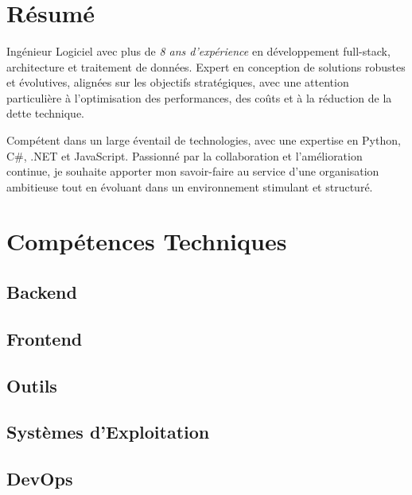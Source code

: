 \documentclass[11pt,a4paper,sans]{moderncv}
\title{\textnormal{\textls[150]{Ingénieur en Architecture Logicielle}}} %
\begin{document}
\makecvtitle

\section{Résumé}
Ingénieur Logiciel avec plus de \textit{8 ans d'expérience} en développement full-stack, architecture et traitement de données. Expert en conception de solutions robustes et évolutives, alignées sur les objectifs stratégiques, avec une attention particulière à l'optimisation des performances, des coûts et à la réduction de la dette technique.

\vspace{0.1cm}

Compétent dans un large éventail de technologies, avec une expertise en Python, C\#, .NET et JavaScript. Passionné par la collaboration et l'amélioration continue, je souhaite apporter mon savoir-faire au service d'une organisation ambitieuse tout en évoluant dans un environnement stimulant et structuré.

\section{Compétences Techniques}
\subsection{Backend}

\subsection{Frontend}

\subsection{Outils}

\subsection{Systèmes d'Exploitation}

\subsection{DevOps}
\end{document}
